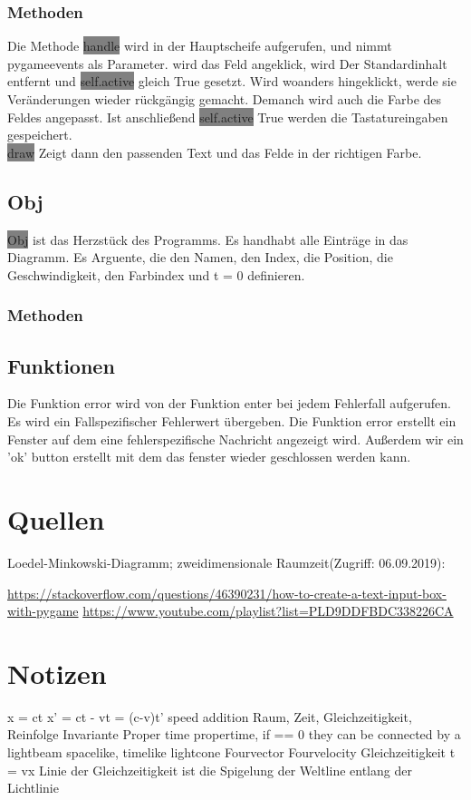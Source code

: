 \documentclass[12pt]{article}
\begin{document}
\subsubsection{Methoden}
Die Methode \colorbox{gray}{handle} wird in der Hauptscheife aufgerufen, und nimmt pygameevents als Parameter.
wird das Feld angeklick, wird Der Standardinhalt entfernt und \colorbox{gray}{self.active} gleich True gesetzt.
Wird woanders hingeklickt, werde sie Veränderungen wieder rückgängig gemacht.
Demanch wird auch die Farbe des Feldes angepasst.
Ist anschließend \colorbox{gray}{self.active} True werden die Tastatureingaben gespeichert.
\\
\colorbox{gray}{draw} Zeigt dann den passenden Text und das Felde in der richtigen Farbe.
\subsection{Obj}
\colorbox{gray}{Obj} ist das Herzstück des Programms.
Es handhabt alle Einträge in das Diagramm.
Es Arguente, die den Namen, den Index, die Position, die Geschwindigkeit, den Farbindex und t = 0 definieren.

\subsubsection{Methoden}
\subsection{Funktionen}
Die Funktion error wird von der Funktion enter bei jedem Fehlerfall aufgerufen.
Es wird ein Fallspezifischer Fehlerwert übergeben.
Die Funktion error erstellt ein Fenster auf dem eine fehlerspezifische Nachricht angezeigt wird.
Außerdem wir ein 'ok' button erstellt mit dem das fenster wieder geschlossen werden kann.
\section{Quellen}
Loedel-Minkowski-Diagramm; zweidimensionale Raumzeit(Zugriff: 06.09.2019):

\url{https://stackoverflow.com/questions/46390231/how-to-create-a-text-input-box-with-pygame}
\url{https://www.youtube.com/playlist?list=PLD9DDFBDC338226CA}
\section{Notizen}

x = ct
x' = ct - vt = (c-v)t'
speed addition
Raum, Zeit, Gleichzeitigkeit, Reinfolge
Invariante Proper time
propertime, if == 0 they can be connected by a lightbeam
spacelike, timelike
lightcone
Fourvector
Fourvelocity
Gleichzeitigkeit t = vx
Linie der Gleichzeitigkeit ist die Spigelung der Weltline entlang der Lichtlinie
\end{document}

